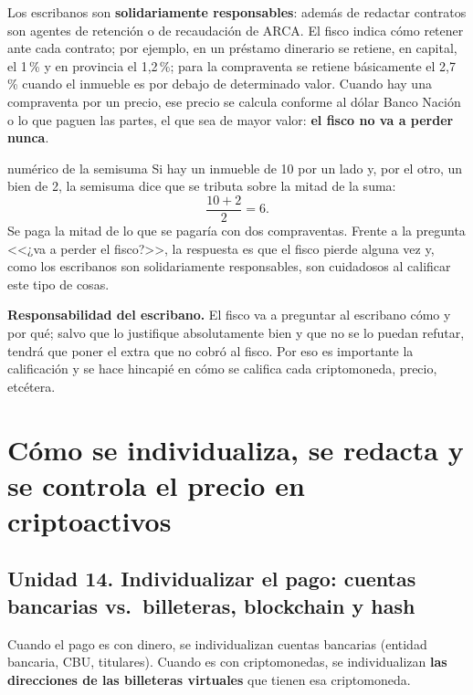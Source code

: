 \documentclass[12pt,oneside,a4paper]{book}
\begin{document}
Los escribanos son \textbf{solidariamente responsables}: además de redactar contratos son agentes de retención o de recaudación de ARCA. El fisco indica cómo retener ante cada contrato; por ejemplo, en un préstamo dinerario se retiene, en capital, el 1\,\% y en provincia el 1,2\,\%; para la compraventa se retiene básicamente el 2,7\,\% cuando el inmueble es por debajo de determinado valor. Cuando hay una compraventa por un precio, ese precio se calcula conforme al dólar Banco Nación o lo que paguen las partes, el que sea de mayor valor: \textbf{el fisco no va a perder nunca}.

\begin{example}{numérico de la semisuma}
Si hay un inmueble de 10 por un lado y, por el otro, un bien de 2, la semisuma dice que se tributa sobre la mitad de la suma:
\[
\frac{10 + 2}{2} = 6.
\]
Se paga la mitad de lo que se pagaría con dos compraventas. Frente a la pregunta <<¿va a perder el fisco?>>, la respuesta es que el fisco pierde alguna vez y, como los escribanos son solidariamente responsables, son cuidadosos al calificar este tipo de cosas.
\end{example}

\begin{important}
\textbf{Responsabilidad del escribano.} El fisco va a preguntar al escribano cómo y por qué; salvo que lo justifique absolutamente bien y que no se lo puedan refutar, tendrá que poner el extra que no cobró al fisco. Por eso es importante la calificación y se hace hincapié en cómo se califica cada criptomoneda, precio, etcétera.
\end{important}

\chapter{Cómo se individualiza, se redacta y se controla el precio en criptoactivos}

\section{Unidad 14. Individualizar el pago: cuentas bancarias vs.\ billeteras, blockchain y hash}

Cuando el pago es con dinero, se individualizan cuentas bancarias (entidad bancaria, CBU, titulares). Cuando es con criptomonedas, se individualizan \textbf{las direcciones de las billeteras virtuales} que tienen esa criptomoneda.
\end{document}
